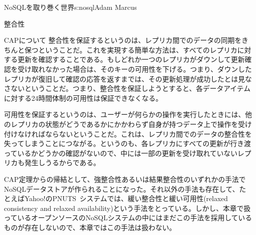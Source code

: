 \begin{aosachapter}{NoSQLを取り巻く世界}{s:nosql}{Adam Marcus}
\begin{aosasect1}{整合性}
\begin{aosasect2}{CAPについて}
整合性を保証するというのは、レプリカ間でのデータの同期をきちんと保つということだ。これを実現する簡単な方法は、すべてのレプリカに対する更新を確認することである。もしどれか一つのレプリカがダウンして更新確認を受け取れなかった場合は、そのキーの可用性を下げる。つまり、ダウンしたレプリカが復旧して確認の応答を返すまでは、その更新処理が成功したとは見なさないということだ。つまり、整合性を保証しようとすると、各データアイテムに対する24時間体制の可用性は保証できなくなる。

可用性を保証するというのは、ユーザーが何らかの操作を実行したときには、他のレプリカの状態がどうであるかにかかわらず自身が持つデータ上で操作を受け付けなければならないということだ。これは、レプリカ間でのデータの整合性を失ってしまうことにつながる。というのも、各レプリカにすべての更新が行き渡っているかどうかの確認がないので、中には一部の更新を受け取れていないレプリカも発生しうるからである。

CAP定理からの帰結として、強整合性あるいは結果整合性のいずれかの手法でNoSQLデータストアが作られることになった。それ以外の手法も存在して、たとえばYahoo!のPNUTS~\cite{bib:pnuts}システムでは、緩い整合性と緩い可用性(relaxed consistency and relaxed availability)という手法をとっている。しかし、本章で扱っているオープンソースのNoSQLシステムの中にはまだこの手法を採用しているものが存在しないので、本章ではこの手法は扱わない。


\end{aosasect2}
\end{aosasect1}
\end{aosachapter}
